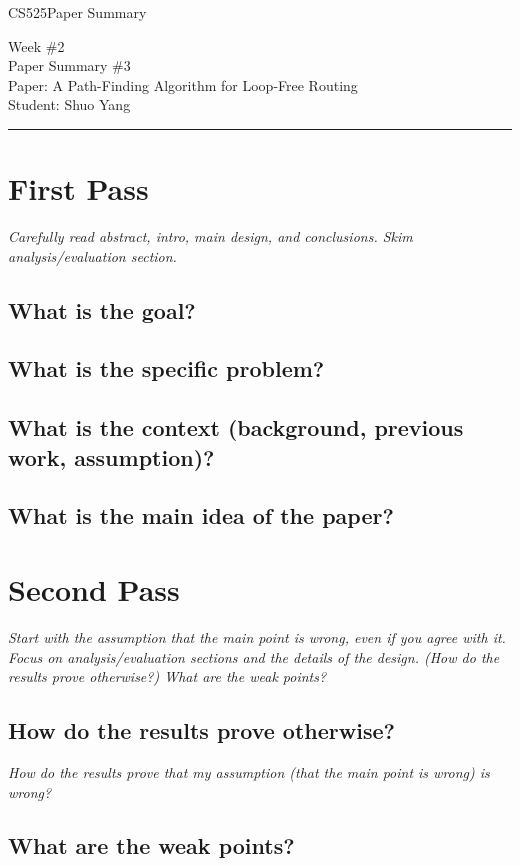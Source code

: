 \documentclass[11pt]{article}
\def\CourseCode{CS525}
\def\WeekNo{2}
\def\PaperNo{3}
\def\Category{Paper Summary}
\def\PaperTitle{A Path-Finding Algorithm for Loop-Free Routing}
\def\Author{Shuo Yang}
\begin{document}
\noindent

\CourseCode \hfill \Category

\begin{center}
Week \#\WeekNo\\
Paper Summary \#\PaperNo\\
Paper: \PaperTitle\\
Student: \Author\\
\end{center}

\hrule\smallskip

\section{First Pass}

\emph{Carefully read abstract, intro, main design, and
  conclusions. Skim analysis/evaluation section.}

\subsection{What is the goal?}

\subsection{What is the specific problem?}

\subsection{What is the context (background, previous work,
  assumption)?} 

\subsection{What is the main idea of the paper?}

\section{Second Pass}

\emph{Start with the assumption that the main point is wrong, even if
  you agree with it. Focus on analysis/evaluation sections and the
  details of the design. (How do the results prove otherwise?) What
  are the weak points?}

\subsection{How do the results prove otherwise?}
\emph{How do the results prove that my assumption (that the main point
  is wrong) is wrong?}

\subsection{What are the weak points?}
\end{document}
